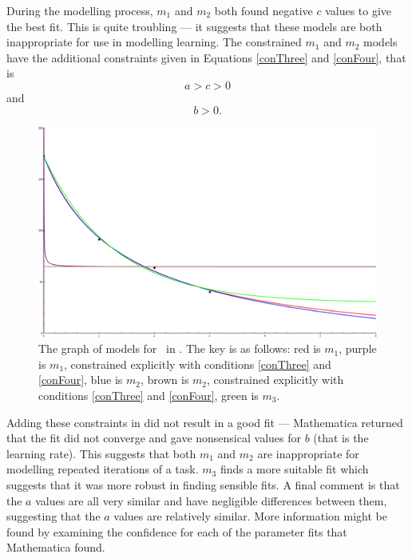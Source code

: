 During the modelling process, $m_1$ and $m_2$ both found negative $c$ values to
give the best fit.
This is quite troubling --- it suggests that these models are both inappropriate
for use in modelling learning.
The constrained $m_1$ and $m_2$ models have the additional constraints given in
Equations \ref{conThree} and \ref{conFour}, that is
\[
  a > c > 0
\]
and
\[
  b > 0.
\]

\begin{figure}[ht!]
\centering
\includegraphics[scale=0.35,angle=90]{./media/P1LAGraph.png}
\caption{The graph of models for \PO\ in \LA. The key is as follows:
		 red is $m_1$,
		 purple is $m_1$, constrained explicitly with conditions \ref{conThree} and \ref{conFour},
		 blue is $m_2$,
		 brown is $m_2$, constrained explicitly with conditions \ref{conThree} and \ref{conFour},
		 green is $m_3$.
}
\label{figure:P1LA:abc}
\end{figure}

Adding these constraints in did not result in a good fit --- Mathematica
returned that the fit did not converge and gave nonsensical values for $b$ (that
is the learning rate).
This suggests that both $m_1$ and $m_2$ are inappropriate for modelling repeated
iterations of a task.
$m_3$ finds a more suitable fit which suggests that it was more robust in
finding sensible fits.
A final comment is that the $a$ values are all very similar and have negligible
differences between them, suggesting that the $a$ values are relatively similar.
More information might be found by examining the confidence for each of the
parameter fits that Mathematica found.

